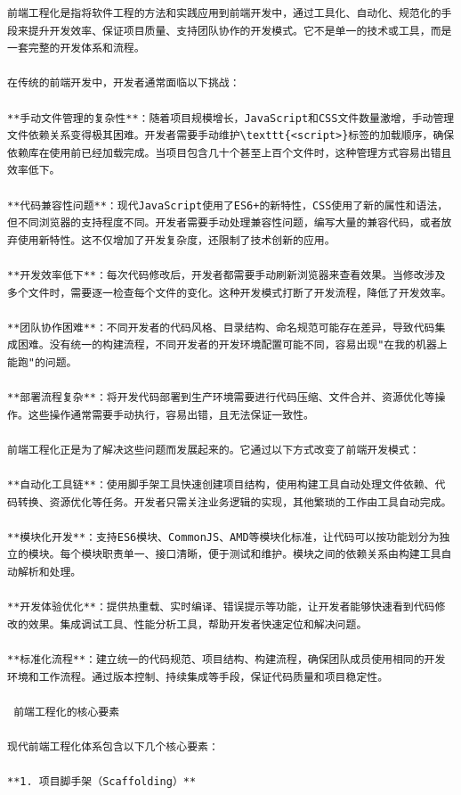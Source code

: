 {{\begin{lstlisting}
前端工程化是指将软件工程的方法和实践应用到前端开发中，通过工具化、自动化、规范化的手段来提升开发效率、保证项目质量、支持团队协作的开发模式。它不是单一的技术或工具，而是一套完整的开发体系和流程。

在传统的前端开发中，开发者通常面临以下挑战：

**手动文件管理的复杂性**：随着项目规模增长，JavaScript和CSS文件数量激增，手动管理文件依赖关系变得极其困难。开发者需要手动维护\texttt{<script>}标签的加载顺序，确保依赖库在使用前已经加载完成。当项目包含几十个甚至上百个文件时，这种管理方式容易出错且效率低下。

**代码兼容性问题**：现代JavaScript使用了ES6+的新特性，CSS使用了新的属性和语法，但不同浏览器的支持程度不同。开发者需要手动处理兼容性问题，编写大量的兼容代码，或者放弃使用新特性。这不仅增加了开发复杂度，还限制了技术创新的应用。

**开发效率低下**：每次代码修改后，开发者都需要手动刷新浏览器来查看效果。当修改涉及多个文件时，需要逐一检查每个文件的变化。这种开发模式打断了开发流程，降低了开发效率。

**团队协作困难**：不同开发者的代码风格、目录结构、命名规范可能存在差异，导致代码集成困难。没有统一的构建流程，不同开发者的开发环境配置可能不同，容易出现"在我的机器上能跑"的问题。

**部署流程复杂**：将开发代码部署到生产环境需要进行代码压缩、文件合并、资源优化等操作。这些操作通常需要手动执行，容易出错，且无法保证一致性。

前端工程化正是为了解决这些问题而发展起来的。它通过以下方式改变了前端开发模式：

**自动化工具链**：使用脚手架工具快速创建项目结构，使用构建工具自动处理文件依赖、代码转换、资源优化等任务。开发者只需关注业务逻辑的实现，其他繁琐的工作由工具自动完成。

**模块化开发**：支持ES6模块、CommonJS、AMD等模块化标准，让代码可以按功能划分为独立的模块。每个模块职责单一、接口清晰，便于测试和维护。模块之间的依赖关系由构建工具自动解析和处理。

**开发体验优化**：提供热重载、实时编译、错误提示等功能，让开发者能够快速看到代码修改的效果。集成调试工具、性能分析工具，帮助开发者快速定位和解决问题。

**标准化流程**：建立统一的代码规范、项目结构、构建流程，确保团队成员使用相同的开发环境和工作流程。通过版本控制、持续集成等手段，保证代码质量和项目稳定性。

 前端工程化的核心要素

现代前端工程化体系包含以下几个核心要素：

**1. 项目脚手架（Scaffolding）**


\end{lstlisting}}}
